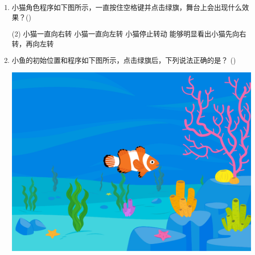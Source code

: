 \documentclass[10pt, a4paper]{article}
\newcommand{\hq}{\hfill(\qquad)}
\begin{document}
\begin{enumerate}
        \item 小猫角色程序如下图所示，一直按住空格键并点击绿旗，舞台上会出现什么效果？\hq
        \begin{tasks}(2)
            \task 小猫一直向右转
            \task 小猫一直向左转
            \task 小猫停止转动
            \task 能够明显看出小猫先向右转，再向左转
        \end{tasks}

        \item 小鱼的初始位置和程序如下图所示，点击绿旗后，下列说法正确的是？ \hq
        
        \begin{minipage}{.18\textwidth}
            \centering
            \includegraphics[width=\textwidth]{figure/22-1.png}
        \end{minipage}
        \begin{minipage}{.13\textwidth}
            \centering

\end{minipage}
\end{enumerate}
\end{document}
